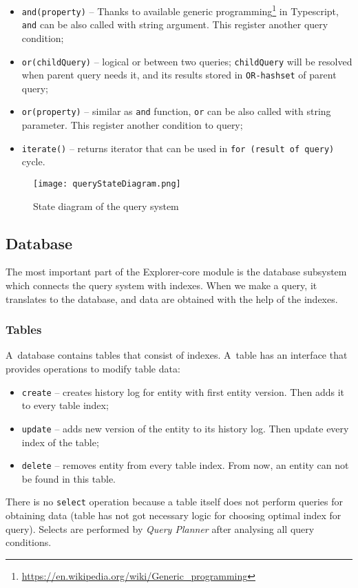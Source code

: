 \begin{itemize}
    \item \texttt{and(property)} -- Thanks to available generic programming\footnote{\url{https://en.wikipedia.org/wiki/Generic_programming}} in Typescript, \texttt{and} can be also called with string argument. This register another query condition;
    \item \texttt{or(childQuery)} -- logical or between two queries; \texttt{childQuery} will be resolved when parent query needs it, and its results stored in \texttt{OR-hashset} of parent query;
    \item \texttt{or(property)} -- similar as \texttt{and} function, \texttt{or} can be also called with string parameter. This register another condition to query;
    \item \texttt{iterate()} -- returns iterator that can be used in \texttt{for (result of query)} cycle.
\end{itemize}


\begin{figure}[h]
    \centering
    \texttt{[image: queryStateDiagram.png]}
    \caption{State diagram of the query system}
    \label{queryStateDiagram}
\end{figure}


\subsection{Database}
The most important part of the Explorer-core module is the database subsystem which connects the query system with indexes. When we make a query, it translates to the database, and data are obtained with the help of the indexes.

\subsubsection{Tables}
A~database contains tables that consist of indexes. A~table has an interface that provides operations to modify table data:
\begin{itemize}
    \item \texttt{create} -- creates history log for entity with first entity version. Then adds it to every table index;
    \item \texttt{update} -- adds new version of the entity to its history log. Then update every index of the table;
    \item \texttt{delete} -- removes entity from every table index. From now, an entity can not be found in this table.
\end{itemize}
There is no \texttt{select} operation because a table itself does not perform queries for obtaining data (table has not got necessary logic for choosing optimal index for query). Selects are performed by \textit{Query Planner} after analysing all query conditions.

